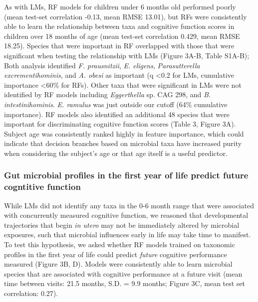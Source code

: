 \documentclass{article}
\begin{document}
As with LMs, RF models for children under 6 months old
performed poorly (mean test-set correlation -0.13, mean RMSE 13.01),
but RFs were consistently able to learn the relationship between taxa
and cognitive function scores in children over 18 months of age (mean
test-set correlation 0.429, mean RMSE 18.25).
Species that were important in RF overlapped with those that were
significant when testing the relationship with LMs (Figure
3A-B, Table S1A-B); Both analysis identified 
\textit{F. prausnitzii}, %
\textit{E. eligens}, %
\textit{Parasutterella excrementihominis}, and %
\textit{A. obesi} as important %
(q \textless 0.2 for LMs, cumulative importance \textless 60\% for RFs).
Other taxa that were significant in LMs were not identified by RF models
including \textit{Eggerthella} sp. CAG 298,
and \textit{B. intestinihominis}. \textit{E. ramulus}
was just outside our cutoff (64\% cumulative importance). %
RF models also identified an additional 48 species
that were important for discriminating cognitive function scores
(Table 3, Figure 3A). Subject age was consistently ranked highly in
feature importance, which could indicate that decision branches based on
microbial taxa have increased purity when considering the subject's age
or that age itself is a useful predictor.

\subsubsection*{Gut microbial profiles in the first year of life predict future cogntitive function}

While LMs did not identify any taxa in the 0-6 month range
that were associated with concurrently measured cognitive function,
we reasoned that developmental trajectories that begin
\textit{in utero} may not be immediately altered by
microbial exposures, such that microbial influences early in life
may take time to manifest. To test this hypothesis,
we asked whether RF models trained on taxonomic profiles
in the first year of life
could predict \textit{future} cognitive performance measured (Figure 3B, D).
Models were consistently able to learn microbial species that are associated
with cognitive performance at a future visit
(mean time between visits: 21.5 months, S.D. = 9.9 months; Figure 3C,
mean test set correlation: 0.27).
\end{document}
